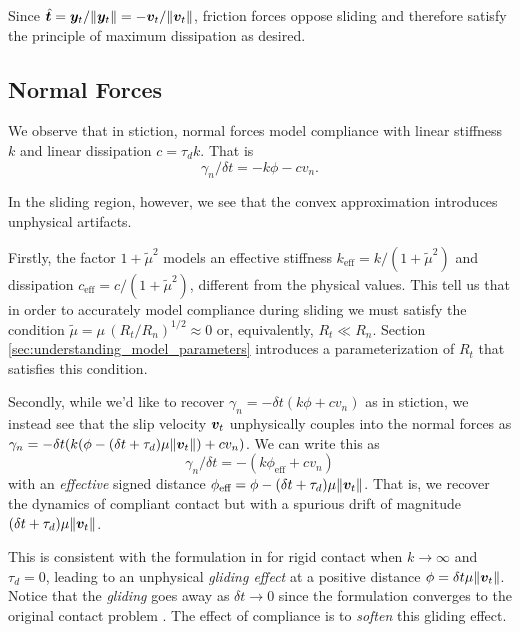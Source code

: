 Since $\hat{{\bm{t}}} = {\bm{y}}_t/\Vert{\bm{y}}_t\Vert =
-{\bm{v}}_t/\Vert{\bm{v}}_t\Vert$, friction forces oppose sliding and therefore
satisfy the principle of maximum dissipation as desired.

\subsection{Normal Forces}
We observe that in stiction, normal forces model compliance with linear
stiffness $k$ and linear dissipation $c = \tau_d k$. That is
\begin{equation}
    \gamma_n/ \delta t = -k\phi - c v_n.
\end{equation}

In the sliding region, however, we see that the convex approximation introduces
unphysical artifacts. 

Firstly, the factor $1+\tilde{\mu}^2$ models an effective stiffness
$k_\text{eff}=k/(1+\tilde{\mu}^2)$ and dissipation
$c_\text{eff}=c/(1+\tilde{\mu}^2)$, different from the physical values. This
tell us that in order to accurately model compliance during sliding we must
satisfy the condition $\tilde\mu=\mu\,(R_t/R_n)^{1/2} \approx 0$ or,
equivalently, $R_t \ll R_n$. Section \ref{sec:understanding_model_parameters}
introduces a parameterization of $R_t$ that satisfies this condition.

Secondly, while we'd like to recover $\gamma_n = -\delta t(k\phi + c v_n)$ as in
stiction, we instead see that the slip velocity ${\bm{v}}_t$
unphysically couples into the normal forces as $\gamma_n=-\delta
t(k(\phi-(\delta t+\tau_d)\mu\Vert{\bm{v}}_t\Vert) + cv_n)$. We can write this as
\begin{equation}
  \gamma_n/\delta t=-(k\phi_\text{eff} + c v_n)
\end{equation}
with an \textit{effective} signed distance $\phi_\text{eff} = \phi-(\delta
t+\tau_d)\mu\Vert{\bm{v}}_t\Vert$. That is, we recover the dynamics of compliant
contact but with a spurious drift of magnitude 
$(\delta t+\tau_d)\mu\Vert{\bm{v}}_t\Vert$.

This is consistent with the formulation in \cite{bib:anitescu2010} for rigid
contact when $k\rightarrow \infty$ and $\tau_d=0$, leading to an unphysical
\textit{gliding effect} at a positive distance $\phi=\delta
t\mu\Vert{\bm{v}}_t\Vert$. Notice that the \textit{gliding} goes away as $\delta
t\rightarrow 0$ since the formulation converges to the original contact problem
\cite{bib:anitescu2006}. The effect of compliance is to \textit{soften} this
gliding effect. 

